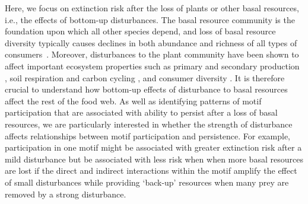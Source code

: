 \documentclass[12pt]{article}
\begin{document}
\begin{spacing}{2.0}
    
    Here, we focus on extinction risk after the loss of plants or other basal resources, i.e., the effects of bottom-up disturbances.
    The basal resource community is the foundation upon which all other species depend, and loss of basal resource diversity typically causes declines in both abundance and richness of all types of consumers~\citep{scherber2010bottom,Dobson2009food, Mduma1999food, Georgiadis2007}.
    Moreover, disturbances to the plant community have been shown to affect important ecosystem properties such as primary \citep{Hector1999} and secondary production \citep{borer2012plant}, soil respiration and carbon cycling \citep{chen2019plant}, and consumer diversity \citep{scherber2010bottom, Baiser2016,li2020bottom}.
    It is therefore crucial to understand how bottom-up effects of disturbance to basal resources affect the rest of the food web.
    As well as identifying patterns of motif participation that are associated with ability to persist after a loss of basal resources, we are particularly interested in whether the strength of  disturbance affects relationships between motif participation and persistence.
    For example, participation in one motif might be associated with greater extinction risk after a mild disturbance but be associated with less risk when when more basal resources are lost if the direct and indirect interactions within the motif amplify the effect of small disturbances while providing `back-up' resources when many prey are removed by a strong disturbance.



\end{spacing}
\end{document}
